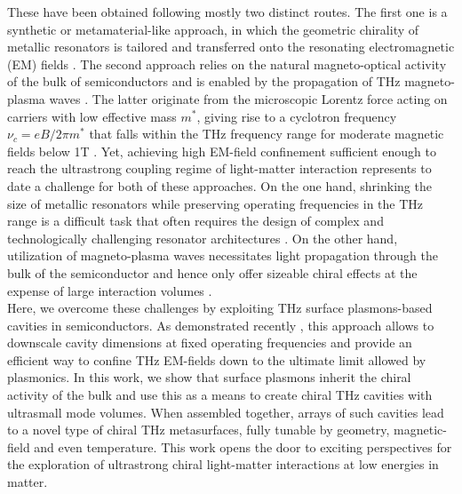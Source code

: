 \documentclass[twocolumn]{article}
\begin{document}
These have been obtained following mostly two distinct routes. The first one is a synthetic or metamaterial-like approach, in which the geometric chirality of metallic resonators is tailored and transferred onto the resonating electromagnetic (EM) fields \cite{Zhang_2012, Wu_2014, Kan_2015,Kim_2017,Choi_2019,Cong_2019}. The second approach relies on the natural magneto-optical activity of the bulk of semiconductors \cite{Mu_2019, Tan_2021, Ju_2023} and is enabled by the propagation of THz magneto-plasma waves \cite{Palik_1970, Wang_2009}. The latter originate from the microscopic Lorentz force acting on carriers with low effective mass $m^{*}$, giving rise to a cyclotron frequency $\nu_c=eB/2\pi m^{*}$ that falls within the THz frequency range for moderate magnetic fields below 1T \cite{Shimano_2002}. Yet, achieving high EM-field confinement sufficient enough to reach the ultrastrong coupling regime of light-matter interaction represents to date a challenge for both of these approaches. On the one hand, shrinking the size of metallic resonators while preserving operating frequencies in the THz range is a difficult task that often requires the design of complex and technologically challenging resonator architectures \cite{Paulillo_2014, Keller_2017, Mottaghizadeh_2017}. On the other hand, utilization of magneto-plasma waves necessitates light propagation through the bulk of the semiconductor and hence only offer sizeable chiral effects at the expense of large interaction volumes \cite{Ju_2023,Wang_2009}. \\
Here, we overcome these challenges by exploiting THz surface plasmons-based cavities in semiconductors. As demonstrated recently \cite{Aupiais_2023}, this approach allows to downscale cavity dimensions at fixed operating frequencies and provide an efficient way to confine THz EM-fields down to the ultimate limit allowed by plasmonics. In this work, we show that surface plasmons inherit the chiral activity of the bulk and use this as a means to create chiral THz cavities with ultrasmall mode volumes. When assembled together, arrays of such cavities lead to a novel type of chiral THz metasurfaces, fully tunable by geometry, magnetic-field and even temperature. This work opens the door to exciting perspectives for the exploration of ultrastrong chiral light-matter interactions at low energies in matter.
\end{document}
